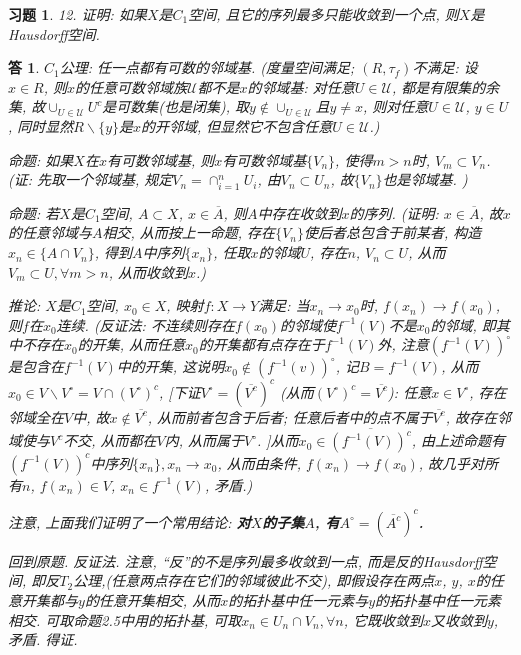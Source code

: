 \documentclass{ctexart}%
\newtheorem*{exercise}{习题}
\newtheorem*{solution}{答}
\theoremstyle{definition}
\theoremstyle{remark}
\begin{document}
\begin{exercise}12. 证明: 如果$X$是$C_1$空间, 且它的序列最多只能收敛到一个点, 则$X$是Hausdorff空间.
\end{exercise}
\begin{solution}
$C_1$公理: 任一点都有可数的邻域基. (度量空间满足; $(R,\tau_f)$不满足: 设$x\in R$, 则$x$的任意可数邻域族$\mathscr{U}$都不是$x$的邻域基: 对任意$U\in \mathscr{U}$, 都是有限集的余集, 故$\cup_{U\in \mathscr{U}} U^c$是可数集(也是闭集), 取$y\notin \cup_{U\in \mathscr{U}}$且$y\neq x$, 则对任意$U\in \mathscr{U}$, $y\in U$, 同时显然$R\backslash \{y\}$是$x$的开邻域, 但显然它不包含任意$U\in \mathscr{U}$.)

命题: 如果$X$在$x$有可数邻域基, 则$x$有可数邻域基$\{V_n\}$, 使得$m>n$时, $V_m\subset V_n$. (证: 先取一个邻域基, 规定$V_n=\cap_{i=1}^n U_i$, 由$V_n\subset U_n$, 故$\{V_n\}$也是邻域基. )

命题: 若$X$是$C_1$空间, $A\subset X$, $x\in \overline{A}$, 则$A$中存在收敛到$x$的序列. (证明: $x\in \overline{A}$, 故$x$的任意邻域与$A$相交, 从而按上一命题, 存在$\{V_n\}$使后者总包含于前某者, 构造$x_n\in\{A\cap V_n\}$, 得到$A$中序列$\{x_n\}$, 任取$x$的邻域$U$, 存在$n$, $V_n\subset U$, 从而$V_m\subset U, \forall m >n$, 从而收敛到$x$.)

推论: $X$是$C_1$空间, $x_0\in X$, 映射$f:X\rightarrow Y$满足: 当$x_n\rightarrow x_0$时, $f(x_n)\rightarrow f(x_0)$, 则$f$在$x_0$连续. (反证法: 不连续则存在$f(x_0)$的邻域使$f^{-1}(V)$不是$x_0$的邻域, 即其中不存在$x_0$的开集, 从而任意$x_0$的开集都有点存在于$f^{-1}(V)$外, 注意$(f^{-1}(V))^\circ$是包含在$f^{-1}(V)$中的开集, 这说明$x_0\notin (f^{-1}(v))^\circ$, 记$B=f^{-1}(V)$, 从而$x_0\in V\backslash V^\circ = V\cap (V^\circ)^c$, [下证$V^\circ=(\overline{V^c})^c$ (从而$(V^\circ)^c=
\overline{V^c}$): 任意$x\in V^\circ$, 存在邻域全在$V$中, 故$x\notin \overline{V^c}$, 从而前者包含于后者; 任意后者中的点不属于$\overline{V^c}$, 故存在邻域使与$V^c$不交, 从而都在$V$内, 从而属于$V^\circ$. ]从而$x_0\in \overline{(f^{-1}(V))^c}$, 由上述命题有$(f^{-1}(V))^c$中序列$\{x_n\}, x_n\rightarrow x_0$, 从而由条件, $f(x_n)\rightarrow f(x_0)$, 故几乎对所有$n$, $f(x_n)\in V$, $x_n\in f^{-1}(V)$, 矛盾.)


注意, 上面我们证明了一个常用结论: \textbf{对$X$的子集$A$, 有$A^\circ=(\overline{A^c})^c$.}

回到原题. 反证法. 注意, ``反''的不是序列最多收敛到一点, 而是反的Hausdorff空间, 即反$T_2$公理,(任意两点存在它们的邻域彼此不交), 即假设存在两点$x$, $y$, $x$的任意开集都与$y$的任意开集相交, 从而$x$的拓扑基中任一元素与$y$的拓扑基中任一元素相交. 可取命题2.5中用的拓扑基, 可取$x_n\in U_n\cap V_n, \forall n$, 它既收敛到$x$又收敛到$y$, 矛盾. 得证.
\end{solution}
\end{document}
